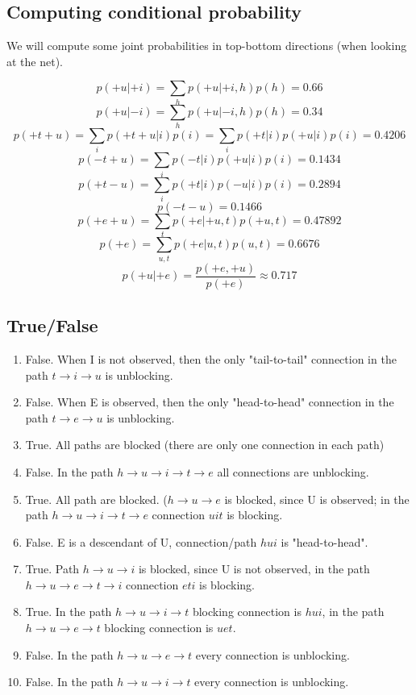 \documentclass{article}
\begin{document}
\subsection{Computing conditional probability}

We will compute some joint probabilities in top-bottom directions (when looking at the net).

$$
p(+u|+i) = \sum\limits_h p(+u| +i, h) p(h) = 0.66
$$
$$
p(+u|-i) =  \sum\limits_h p(+u| -i, h) p(h) = 0.34
$$
$$
p(+t+u) = \sum\limits_i p(+t+u|i) p(i) = \sum\limits_i p(+t|i)p(+u|i) p(i) = 0.4206
$$
$$
p(-t+u) = \sum\limits_i p(-t|i)p(+u|i) p(i) = 0.1434
$$
$$
p(+t-u) = \sum\limits_i p(+t|i)p(-u|i) p(i) = 0.2894
$$
$$
p(-t-u) = 0.1466
$$
$$
p(+e+u) = \sum\limits_t p(+e|+u,t) p(+u,t)= 0.47892
$$
$$
p(+e) = \sum\limits_{u, t} p(+e|u,t) p(u, t) = 0.6676
$$
$$
\boxed{p(+u | +e) = \frac{p(+e,+u)}{p(+e)} \approx 0.717}
$$


\subsection{True/False}

\begin{enumerate}
	\item False. When I is not observed, then the only "tail-to-tail" connection in the path $t \rightarrow i \rightarrow u$ is unblocking.
	\item False. When E is observed, then the only "head-to-head" connection in the path $t \rightarrow e \rightarrow u$ is unblocking.
	\item True. All paths are blocked (there are only one connection in each path)
	\item False. In the path $h \rightarrow u \rightarrow i \rightarrow t \rightarrow e$ all connections are unblocking.
	\item True. All path are blocked. ($h \rightarrow u \rightarrow e$ is blocked, since U is observed; in the path $h \rightarrow u \rightarrow i \rightarrow t \rightarrow e$ connection $uit$ is blocking.
	\item False. E is a descendant of U, connection/path $hui$ is "head-to-head". 
	\item True. Path $h \rightarrow u \rightarrow i$ is blocked, since U is not observed, in the path $h \rightarrow u \rightarrow e \rightarrow t \rightarrow i$ connection $eti$ is blocking.
	\item True. In the path $h \rightarrow u \rightarrow i \rightarrow t$ blocking connection is $hui$, in the path $h \rightarrow u \rightarrow e \rightarrow t$ blocking connection is $uet$.
	\item False. In the path $h \rightarrow u \rightarrow e \rightarrow t$ every connection is unblocking.
	\item False. In the path $h \rightarrow u \rightarrow i \rightarrow t$ every connection is unblocking.
\end{enumerate}
\end{document}
